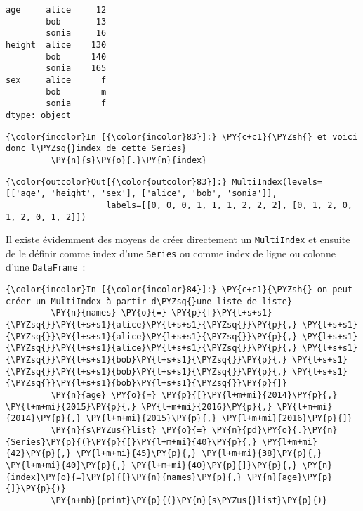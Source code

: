     \begin{Verbatim}[commandchars=\\\{\}]
age     alice     12
        bob       13
        sonia     16
height  alice    130
        bob      140
        sonia    165
sex     alice      f
        bob        m
        sonia      f
dtype: object

    \end{Verbatim}

    \begin{Verbatim}[commandchars=\\\{\}]
{\color{incolor}In [{\color{incolor}83}]:} \PY{c+c1}{\PYZsh{} et voici donc l\PYZsq{}index de cette Series}
         \PY{n}{s}\PY{o}{.}\PY{n}{index}
\end{Verbatim}


\begin{Verbatim}[commandchars=\\\{\}]
{\color{outcolor}Out[{\color{outcolor}83}]:} MultiIndex(levels=[['age', 'height', 'sex'], ['alice', 'bob', 'sonia']],
                    labels=[[0, 0, 0, 1, 1, 1, 2, 2, 2], [0, 1, 2, 0, 1, 2, 0, 1, 2]])
\end{Verbatim}
            
    Il existe évidemment des moyens de créer directement un
\texttt{MultiIndex} et ensuite de le définir comme index d'une
\texttt{Series} ou comme index de ligne ou colonne d'une
\texttt{DataFrame}~:

    \begin{Verbatim}[commandchars=\\\{\}]
{\color{incolor}In [{\color{incolor}84}]:} \PY{c+c1}{\PYZsh{} on peut créer un MultiIndex à partir d\PYZsq{}une liste de liste}
         \PY{n}{names} \PY{o}{=} \PY{p}{[}\PY{l+s+s1}{\PYZsq{}}\PY{l+s+s1}{alice}\PY{l+s+s1}{\PYZsq{}}\PY{p}{,} \PY{l+s+s1}{\PYZsq{}}\PY{l+s+s1}{alice}\PY{l+s+s1}{\PYZsq{}}\PY{p}{,} \PY{l+s+s1}{\PYZsq{}}\PY{l+s+s1}{alice}\PY{l+s+s1}{\PYZsq{}}\PY{p}{,} \PY{l+s+s1}{\PYZsq{}}\PY{l+s+s1}{bob}\PY{l+s+s1}{\PYZsq{}}\PY{p}{,} \PY{l+s+s1}{\PYZsq{}}\PY{l+s+s1}{bob}\PY{l+s+s1}{\PYZsq{}}\PY{p}{,} \PY{l+s+s1}{\PYZsq{}}\PY{l+s+s1}{bob}\PY{l+s+s1}{\PYZsq{}}\PY{p}{]}
         \PY{n}{age} \PY{o}{=} \PY{p}{[}\PY{l+m+mi}{2014}\PY{p}{,} \PY{l+m+mi}{2015}\PY{p}{,} \PY{l+m+mi}{2016}\PY{p}{,} \PY{l+m+mi}{2014}\PY{p}{,} \PY{l+m+mi}{2015}\PY{p}{,} \PY{l+m+mi}{2016}\PY{p}{]}
         \PY{n}{s\PYZus{}list} \PY{o}{=} \PY{n}{pd}\PY{o}{.}\PY{n}{Series}\PY{p}{(}\PY{p}{[}\PY{l+m+mi}{40}\PY{p}{,} \PY{l+m+mi}{42}\PY{p}{,} \PY{l+m+mi}{45}\PY{p}{,} \PY{l+m+mi}{38}\PY{p}{,} \PY{l+m+mi}{40}\PY{p}{,} \PY{l+m+mi}{40}\PY{p}{]}\PY{p}{,} \PY{n}{index}\PY{o}{=}\PY{p}{[}\PY{n}{names}\PY{p}{,} \PY{n}{age}\PY{p}{]}\PY{p}{)}
         \PY{n+nb}{print}\PY{p}{(}\PY{n}{s\PYZus{}list}\PY{p}{)}
\end{Verbatim}


